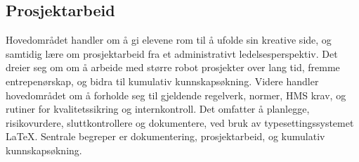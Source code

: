 \subsection*{Prosjektarbeid}

    Hovedområdet handler om å gi elevene rom til å ufolde sin kreative side, og samtidig lære om prosjektarbeid fra et administrativt ledelsesperspektiv.
    Det dreier seg om om å arbeide med større robot prosjekter over lang tid, fremme entrepenørskap, og bidra til kumulativ kunnskapsøkning.
    Videre handler hovedområdet om å forholde seg til gjeldende regelverk, normer, HMS krav, og rutiner for kvalitetssikring og internkontroll.
    Det omfatter å planlegge, risikovurdere, sluttkontrollere og dokumentere, ved bruk av typesettingssystemet LaTeX.
    Sentrale begreper er dokumentering, prosjektarbeid, og kumulativ kunnskapsøkning.
